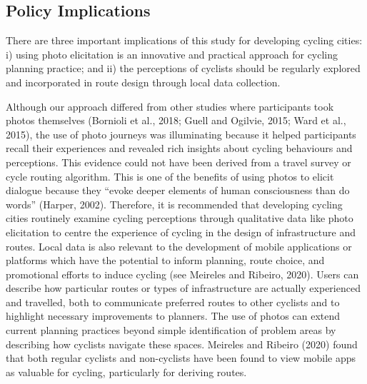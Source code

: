 \documentclass[]{elsarticle} %
\begin{document}
\hypertarget{policy-implications}{%
\subsection{Policy Implications}\label{policy-implications}}

There are three important implications of this study for developing
cycling cities: i) using photo elicitation is an innovative and
practical approach for cycling planning practice; and ii) the
perceptions of cyclists should be regularly explored and incorporated in
route design through local data collection.

Although our approach differed from other studies where participants
took photos themselves (Bornioli et al., 2018; Guell and Ogilvie, 2015;
Ward et al., 2015), the use of photo journeys was illuminating because
it helped participants recall their experiences and revealed rich
insights about cycling behaviours and perceptions. This evidence could
not have been derived from a travel survey or cycle routing algorithm.
This is one of the benefits of using photos to elicit dialogue because
they ``evoke deeper elements of human consciousness than do words''
(Harper, 2002). Therefore, it is recommended that developing cycling
cities routinely examine cycling perceptions through qualitative data
like photo elicitation to centre the experience of cycling in the design
of infrastructure and routes. Local data is also relevant to the
development of mobile applications or platforms which have the potential
to inform planning, route choice, and promotional efforts to induce
cycling (see Meireles and Ribeiro, 2020). Users can describe how
particular routes or types of infrastructure are actually experienced
and travelled, both to communicate preferred routes to other cyclists
and to highlight necessary improvements to planners. The use of photos
can extend current planning practices beyond simple identification of
problem areas by describing how cyclists navigate these spaces. Meireles
and Ribeiro (2020) found that both regular cyclists and non-cyclists
have been found to view mobile apps as valuable for cycling,
particularly for deriving routes.
\end{document}
